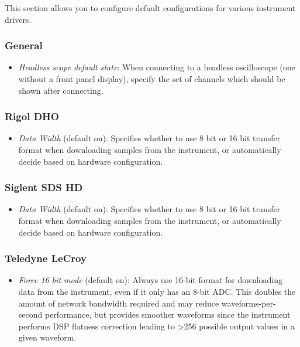 This section allows you to configure default configurations for various instrument drivers.

\subsubsection{General}

\begin{itemize}
\item \emph{Headless scope default state}: When connecting to a headless oscilloscope (one without a front panel
display), specify the set of channels which should be shown after connecting.
\end{itemize}

\subsubsection{Rigol DHO}

\begin{itemize}
\item \emph{Data Width} (default on): Specifies whether to use 8 bit or 16 bit transfer format when downloading samples
from the instrument, or automatically decide based on hardware configuration.
\end{itemize}

\subsubsection{Siglent SDS HD}

\begin{itemize}
\item \emph{Data Width} (default on): Specifies whether to use 8 bit or 16 bit transfer format when downloading samples
from the instrument, or automatically decide based on hardware configuration.
\end{itemize}

\subsubsection{Teledyne LeCroy}

\begin{itemize}
\item \emph{Force 16 bit mode} (default on): Always use 16-bit format for downloading data from the instrument, even if
it only has an 8-bit ADC. This doubles the amount of network bandwidth required and may reduce waveforms-per-second
performance, but provides smoother waveforms since the instrument performs DSP flatness correction leading to >256
possible output values in a given waveform.
\end{itemize}

